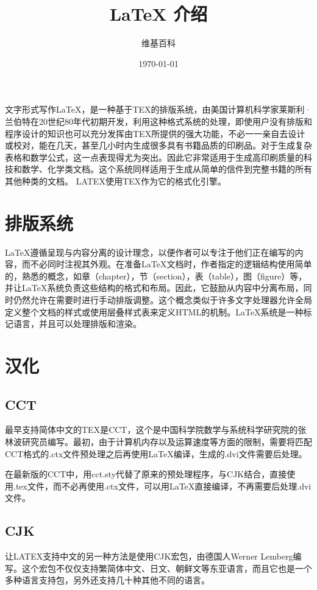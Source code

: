 \documentclass[12pt]{article}
\title{LaTeX 介绍}
\author{维基百科}
\date{\today}
\begin{document}
    \maketitle

    文字形式写作LaTeX，是一种基于TEX的排版系统，由美国计算机科学家莱斯利·兰伯特在20世纪80年代初期开发，利用这种格式系统的处理，即使用户没有排版和程序设计的知识也可以充分发挥由TEX所提供的强大功能，不必一一亲自去设计或校对，能在几天，甚至几小时内生成很多具有书籍品质的印刷品。对于生成复杂表格和数学公式，这一点表现得尤为突出。因此它非常适用于生成高印刷质量的科技和数学、化学类文档。这个系统同样适用于生成从简单的信件到完整书籍的所有其他种类的文档。
    LATEX使用TEX作为它的格式化引擎。

    \section{排版系统}
    LaTeX遵循呈现与内容分离的设计理念，以便作者可以专注于他们正在编写的内容，而不必同时注视其外观。在准备LaTeX文档时，作者指定的逻辑结构使用简单的，熟悉的概念，如章（chapter），节（section），表（table），图（figure）等，并让LaTeX系统负责这些结构的格式和布局。因此，它鼓励从内容中分离布局，同时仍然允许在需要时进行手动排版调整。这个概念类似于许多文字处理器允许全局定义整个文档的样式或使用层叠样式表来定义HTML的机制。LaTeX系统是一种标记语言，并且可以处理排版和渲染。

    \section{汉化}
        \subsection{CCT}
        最早支持简体中文的TEX是CCT，这个是中国科学院数学与系统科学研究院的张林波研究员编写。最初，由于计算机内存以及运算速度等方面的限制，需要将匹配CCT格式的.ctx文件预处理之后再使用LaTeX编译，生成的.dvi文件需要后处理。

        在最新版的CCT中，用cct.sty代替了原来的预处理程序，与CJK结合，直接使用.tex文件，而不必再使用.ctx文件，可以用LaTeX直接编译，不再需要后处理.dvi文件。

        \subsection{CJK}
        让LATEX支持中文的另一种方法是使用CJK宏包，由德国人Werner Lemberg编写。这个宏包不仅仅支持繁简体中文、日文、朝鲜文等东亚语言，而且它也是一个多种语言支持包，另外还支持几十种其他不同的语言。
\end{document}
